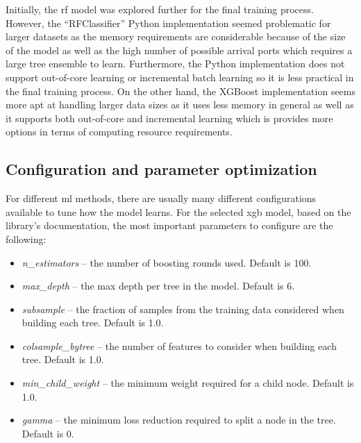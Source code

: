 Initially, the \acrshort{rf} model was explored further for the final training process. However, the ``RFClassifier'' Python implementation seemed problematic for larger datasets as the memory requirements are considerable because of the size of the model as well as the high number of possible arrival ports which requires a large tree ensemble to learn. Furthermore, the Python implementation does not support out-of-core learning or incremental batch learning so it is less practical in the final training process. On the other hand, the XGBoost implementation seems more apt at handling larger data sizes as it uses less memory in general as well as it supports both out-of-core and incremental learning which is provides more options in terms of computing resource requirements.

\subsection{Configuration and parameter optimization}

For different \acrshort{ml} methods, there are usually many different configurations available to tune how the model learns. For the selected \acrfull{xgb} model, based on the library's documentation, the most important parameters to configure are the following:

\begin{itemize}
    \item \textit{n\_estimators} -- the number of boosting rounds used. Default is 100.
    \item \textit{max\_depth} -- the max depth per tree in the model. Default is 6.
    \item \textit{subsample} -- the fraction of samples from the training data considered when building each tree. Default is 1.0.
    \item \textit{colsample\_bytree} -- the number of features to consider when building each tree. Default is 1.0.
    \item \textit{min\_child\_weight} -- the minimum weight required for a child node. Default is 1.0.
    \item \textit{gamma} -- the minimum loss reduction required to split a node in the tree. Default is 0.
\end{itemize}

